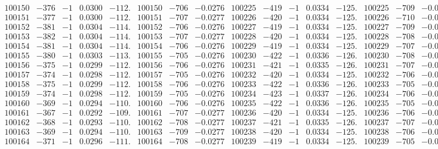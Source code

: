 \documentclass[11pt,reqno,a4letter]{article}
\numberwithin{figure}{section}
\numberwithin{table}{section}
\theoremstyle{plain}
\numberwithin{theorem}{section}
\theoremstyle{definition}
\begin{document}
\begin{table}[ht!]
\begin{equation*}
{\begin{array}{ccccc|ccc||ccccc|ccc}
100150 & -376 & -1 & 0.0300 & -112. & 100150 & -706 & -0.0276 & 100225 & -419 & -1 & 0.0334 & -125. & 100225 & -709 & -0.0277  \\
100151 & -377 & -1 & 0.0300 & -112. & 100151 & -707 & -0.0277 & 100226 & -420 & -1 & 0.0334 & -125. & 100226 & -710 & -0.0277  \\
100152 & -381 & -1 & 0.0304 & -114. & 100152 & -706 & -0.0276 & 100227 & -419 & -1 & 0.0334 & -125. & 100227 & -709 & -0.0277  \\
100153 & -382 & -1 & 0.0304 & -114. & 100153 & -707 & -0.0277 & 100228 & -420 & -1 & 0.0334 & -125. & 100228 & -708 & -0.0277  \\
100154 & -381 & -1 & 0.0304 & -114. & 100154 & -706 & -0.0276 & 100229 & -419 & -1 & 0.0334 & -125. & 100229 & -707 & -0.0276  \\
100155 & -380 & -1 & 0.0303 & -113. & 100155 & -705 & -0.0276 & 100230 & -422 & -1 & 0.0336 & -126. & 100230 & -708 & -0.0277  \\
100156 & -375 & -1 & 0.0299 & -112. & 100156 & -706 & -0.0276 & 100231 & -421 & -1 & 0.0335 & -126. & 100231 & -707 & -0.0276  \\
100157 & -374 & -1 & 0.0298 & -112. & 100157 & -705 & -0.0276 & 100232 & -420 & -1 & 0.0334 & -125. & 100232 & -706 & -0.0276  \\
100158 & -375 & -1 & 0.0299 & -112. & 100158 & -706 & -0.0276 & 100233 & -422 & -1 & 0.0336 & -126. & 100233 & -705 & -0.0276  \\
100159 & -374 & -1 & 0.0298 & -112. & 100159 & -705 & -0.0276 & 100234 & -423 & -1 & 0.0337 & -126. & 100234 & -706 & -0.0276  \\
100160 & -369 & -1 & 0.0294 & -110. & 100160 & -706 & -0.0276 & 100235 & -422 & -1 & 0.0336 & -126. & 100235 & -705 & -0.0276  \\
100161 & -367 & -1 & 0.0292 & -109. & 100161 & -707 & -0.0277 & 100236 & -420 & -1 & 0.0334 & -125. & 100236 & -706 & -0.0276  \\
100162 & -368 & -1 & 0.0293 & -110. & 100162 & -708 & -0.0277 & 100237 & -421 & -1 & 0.0335 & -126. & 100237 & -707 & -0.0276  \\
100163 & -369 & -1 & 0.0294 & -110. & 100163 & -709 & -0.0277 & 100238 & -420 & -1 & 0.0334 & -125. & 100238 & -706 & -0.0276  \\
100164 & -371 & -1 & 0.0296 & -111. & 100164 & -708 & -0.0277 & 100239 & -419 & -1 & 0.0334 & -125. & 100239 & -705 & -0.0275  \\
\end{array}
}
\end{equation*} 

\end{table}
\clearpage 
\end{document}
